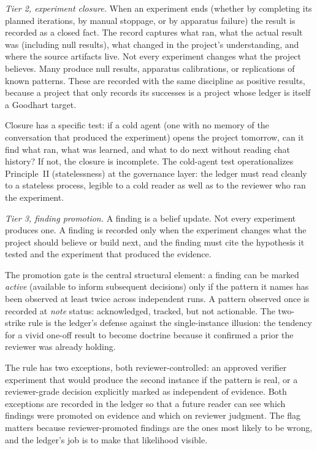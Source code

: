 \documentclass[
  11pt,
]{article}
\begin{document}
\emph{Tier 2, experiment closure.} When an experiment ends (whether by
completing its planned iterations, by manual stoppage, or by apparatus
failure) the result is recorded as a closed fact. The record captures what
ran, what the actual result was (including null results), what changed in
the project's understanding, and where the source artifacts live. Not
every experiment changes what the project believes. Many produce null
results, apparatus calibrations, or replications of known patterns. These
are recorded with the same discipline as positive results, because a
project that only records its successes is a project whose ledger is
itself a Goodhart target.

Closure has a specific test: if a cold agent (one with no
memory of the conversation that produced the experiment) opens the
project tomorrow, can it find what ran, what was learned, and what to do
next without reading chat history? If not, the closure is incomplete.
The cold-agent test operationalizes Principle~II (statelessness) at the governance
layer: the ledger must read cleanly to a stateless process, legible to a
cold reader as well as to the reviewer who ran the experiment.

\emph{Tier 3, finding promotion.} A finding is a belief update. Not
every experiment produces one. A finding is recorded only when the
experiment changes what the project should believe or build next, and the
finding must cite the hypothesis it tested and the experiment that
produced the evidence.

The promotion gate is the central structural element: a finding can be
marked \emph{active} (available to inform subsequent decisions) only if
the pattern it names has been observed at least twice across independent
runs. A pattern observed once is recorded at \emph{note} status:
acknowledged, tracked, but not actionable. The two-strike rule is the
ledger's defense against the single-instance illusion: the tendency for a
vivid one-off result to become doctrine because it confirmed a prior the
reviewer was already holding.

The rule has two exceptions, both reviewer-controlled: an approved
verifier experiment that would produce the second instance if the pattern
is real, or a reviewer-grade decision explicitly marked as independent of
evidence. Both exceptions are recorded in the ledger so that a future
reader can see which findings were promoted on evidence and which on
reviewer judgment. The flag matters because reviewer-promoted findings are
the ones most likely to be wrong, and the ledger's job is to make that
likelihood visible.
\end{document}
